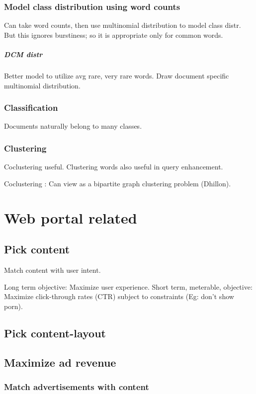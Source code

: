 \documentclass[oneside, article]{memoir}
\begin{document}
\subsection{Model class distribution using word counts}
Can take word counts, then use multinomial distribution to model class distr. But this ignores burstiness; so it is appropriate only for common words.

\paragraph*{DCM distr}
Better model to utilize avg rare, very rare words. Draw document specific multinomial distribution.

\subsection{Classification}
Documents naturally belong to many classes.

\subsection{Clustering}
Coclustering useful. Clustering words also useful in query enhancement.

Coclustering : Can view as a bipartite graph clustering problem (Dhillon).

\chapter{Web portal related}
\section{Pick content}
Match content with user intent.

Long term objective: Maximize user experience. Short term, meterable, objective: Maximize click-through rates (CTR) subject to constraints (Eg: don't show porn).

\section{Pick content-layout}

\section{Maximize ad revenue}
\subsection{Match advertisements with content}
\tbc
\end{document}
